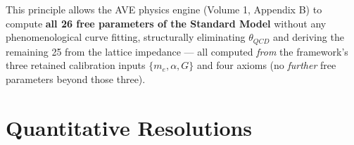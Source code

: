 This principle allows the AVE physics engine (Volume 1, Appendix B)
to compute \textbf{all 26 free parameters of the Standard Model}
without any phenomenological curve fitting, structurally eliminating
$\theta_{QCD}$ and deriving the remaining 25 from the lattice impedance ---
all computed \emph{from} the framework's three retained calibration inputs $\{m_e, \alpha, G\}$ and four axioms (no \emph{further} free parameters beyond those three).

\section{Quantitative Resolutions}
\label{sec:open_problems_resolutions}

